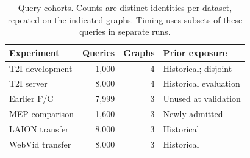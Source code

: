 \begin{table}[t]
\centering
\caption{Query cohorts. Counts are distinct identities per dataset, repeated on the indicated graphs. Timing uses subsets of these queries in separate runs.}
\label{tab:cohorts}
\small
\begin{tabular}{@{}lrrl@{}}
\toprule
Experiment & Queries & Graphs & Prior exposure \\
\midrule
T2I development & 1,000 & 4 & Historical; disjoint \\
T2I server & 8,000 & 4 & Historical evaluation \\
Earlier F/C & 7,999 & 3 & Unused at validation \\
MEP comparison & 1,600 & 3 & Newly admitted \\
LAION transfer & 8,000 & 3 & Historical \\
WebVid transfer & 8,000 & 3 & Historical \\
\bottomrule
\end{tabular}
\end{table}
